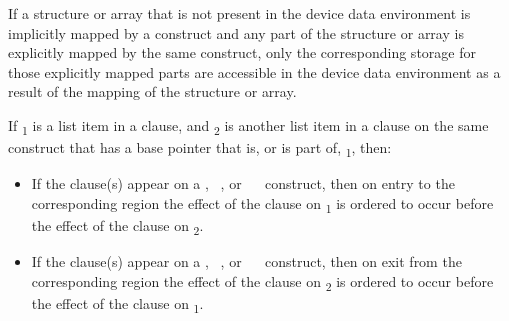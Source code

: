 %
%
If a structure or array that is not present in the device data
environment is implicitly mapped by a construct and any part of the
structure or array is explicitly mapped by the same construct, only
the corresponding storage for those explicitly mapped parts are
accessible in the device data environment as a result of the mapping
of the structure or array.

If \textsubscript{1} is a list item in a  clause, and
\textsubscript{2} is another list item in a  clause on the
same construct that has a base pointer that is, or is part of,
\textsubscript{1}, then:

\begin{itemize}

\item If the  clause(s) appear on a ,
~, or ~~ construct,
then on entry to the corresponding region the effect of the  clause
on \textsubscript{1} is ordered to occur before the effect of the  clause
on \textsubscript{2}.

\item If the  clause(s) appear on a ,
~, or ~~ construct,
then on exit from the corresponding region the effect of the  clause
on \textsubscript{2} is ordered to occur before the effect of the  clause
on \textsubscript{1}.

\end{itemize}

